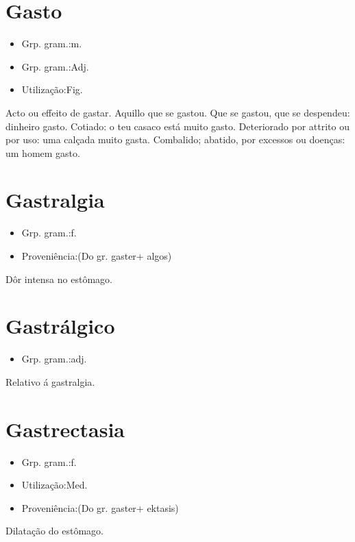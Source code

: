 \section{Gasto}
\begin{itemize}
\item {Grp. gram.:m.}
\end{itemize}
\begin{itemize}
\item {Grp. gram.:Adj.}
\end{itemize}
\begin{itemize}
\item {Utilização:Fig.}
\end{itemize}
Acto ou effeito de gastar.
Aquillo que se gastou.
Que se gastou, que se despendeu: \textunderscore dinheiro gasto\textunderscore .
Cotiado: \textunderscore o teu casaco está muito gasto\textunderscore .
Deteriorado por attrito ou por uso: \textunderscore uma calçada muito gasta\textunderscore .
Combalido; abatido, por excessos ou doenças: \textunderscore um homem gasto\textunderscore .
\section{Gastralgia}
\begin{itemize}
\item {Grp. gram.:f.}
\end{itemize}
\begin{itemize}
\item {Proveniência:(Do gr. \textunderscore gaster\textunderscore  + \textunderscore algos\textunderscore )}
\end{itemize}
Dôr intensa no estômago.
\section{Gastrálgico}
\begin{itemize}
\item {Grp. gram.:adj.}
\end{itemize}
Relativo á gastralgia.
\section{Gastrectasia}
\begin{itemize}
\item {Grp. gram.:f.}
\end{itemize}
\begin{itemize}
\item {Utilização:Med.}
\end{itemize}
\begin{itemize}
\item {Proveniência:(Do gr. \textunderscore gaster\textunderscore  + \textunderscore ektasis\textunderscore )}
\end{itemize}
Dilatação do estômago.
